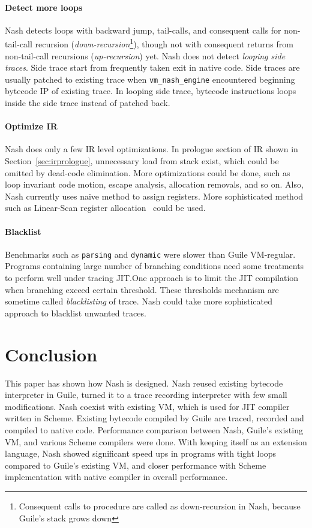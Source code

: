 \documentclass[preprint, 10pt]{sigplanconf}
\begin{document}
\paragraph{Detect more loops} Nash detects loops with backward jump,
tail-calls, and consequent calls for non-tail-call recursion
(\textit{down-recursion}\footnote{Consequent calls to procedure are called as
  down-recursion in Nash, because Guile's stack grows down}), though not with
consequent returns from non-tail-call recursions (\textit{up-recursion})
yet. Nash does not detect \textit{looping side traces}. Side trace start from
frequently taken exit in native code. Side traces are usually patched to
existing trace when \texttt{vm\_nash\_engine} encountered beginning bytecode IP
of existing trace. In looping side trace, bytecode instructions loops inside the
side trace instead of patched back.

\paragraph{Optimize IR} Nash does only a few IR level
optimizations. In prologue section of IR shown in
Section~\hyperref[sec:irprologue]{\ref{sec:irprologue}}, unnecessary load from
stack exist, which could be omitted by dead-code elimination. More optimizations
could be done, such as loop invariant code motion, escape analysis, allocation
removals, and so on. Also, Nash currently uses naive method to assign
registers. More sophisticated method such as Linear-Scan register
allocation~\cite{poletto1999linear} could be used.

\paragraph{Blacklist} Benchmarks such as \texttt{parsing} and
\texttt{dynamic} were slower than Guile VM-regular. Programs containing large
number of branching conditions need some treatments to perform well under
tracing JIT.\@ One approach is to limit the JIT compilation when branching
exceed certain threshold. These thresholds mechanism are sometime called
\textit{blacklisting} of trace. Nash could take more sophisticated approach to
blacklist unwanted traces.

\section{Conclusion}
\label{sec:conclusion}
This paper has shown how Nash is designed. Nash reused existing bytecode
interpreter in Guile, turned it to a trace recording interpreter with few small
modifications. Nash coexist with existing VM, which is used for JIT compiler
written in Scheme. Existing bytecode compiled by Guile are traced, recorded and
compiled to native code. Performance comparison between Nash, Guile's existing
VM, and various Scheme compilers were done. With keeping itself as an extension
language, Nash showed significant speed ups in programs with tight loops
compared to Guile's existing VM, and closer performance with Scheme
implementation with native compiler in overall performance.
\end{document}
